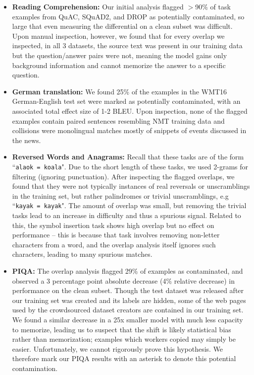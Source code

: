 \begin{itemize}
    \item \textbf{Reading Comprehension:} Our initial analysis flagged $>$90\% of task examples from QuAC, SQuAD2, and DROP as potentially contaminated, so large that even measuring the differential on a clean subset was difficult. Upon manual inspection, however, we found that for every overlap we inspected, in all 3 datasets, the source text was present in our training data but the question/answer pairs were not, meaning the model gains only background information and cannot memorize the answer to a specific question.
    \item \textbf{German translation:} We found 25\% of the examples in the WMT16 German-English test set were marked as potentially contaminated, with an associated total effect size of 1-2 BLEU.  Upon inspection, none of the flagged examples contain paired sentences resembling NMT training data and collisions were monolingual matches mostly of snippets of events discussed in the news.
    \item \textbf{Reversed Words and Anagrams:} Recall that these tasks are of the form ``\texttt{alaok = koala}". Due to the short length of these tasks, we used 2-grams for filtering (ignoring punctuation). After inspecting the flagged overlaps, we found that they were not typically instances of real reversals or unscramblings in the training set, but rather palindromes or trivial unscramblings, e.g ``\texttt{kayak = kayak}". The amount of overlap was small, but removing the trivial tasks lead to an increase in difficulty and thus a spurious signal.  Related to this, the symbol insertion task shows high overlap but no effect on performance -- this is because that task involves removing non-letter characters from a word, and the overlap analysis itself ignores such characters, leading to many spurious matches.
    \item \textbf{PIQA:} The overlap analysis flagged 29\% of examples as contaminated, and observed a 3 percentage point absolute decrease (4\% relative decrease) in performance on the clean subset. Though the test dataset was released after our training set was created and its labels are hidden, some of the web pages used by the crowdsourced dataset creators are contained in our training set. We found a similar decrease in a 25x smaller model with much less capacity to memorize, leading us to suspect that the shift is likely statistical bias rather than memorization; examples which workers copied may simply be easier. Unfortunately, we cannot rigorously prove this hypothesis.  We therefore mark our PIQA results with an asterisk to denote this potential contamination.

\end{itemize}
